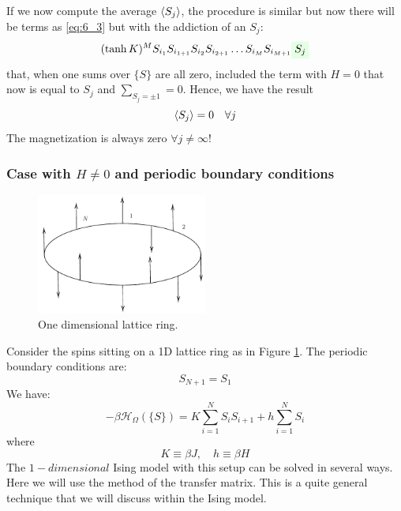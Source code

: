 \documentclass[../main/main.tex]{subfiles}
\begin{document}
 If we now compute the average \( \expval{S_j}  \), the procedure is similar but now there will be terms as \eqref{eq:6_3} but with the addiction of an \( S_j \):
\begin{equation}
  (\tanh K)^M S_{i_1} S_{i_{1+1}} S_{i_2} S_{i_{2+1}} \dots S_{i_M} S_{i_{M+1}} \mathcolorbox{green!10}{S_j}
\end{equation}
that, when one sums over \( \{ S \}   \) are all zero, included the term with \( H=0 \) that now is equal to \( S_j \) and \( \sum_{S_j = \pm 1}^{} = 0   \). Hence, we have the result
\begin{equation}
  \expval{S_j} = 0 \quad \forall j
\end{equation}
The magnetization is always zero \( \forall j \neq \infty  \)!


\subsubsection{Case with \( H\neq0 \) and periodic boundary conditions}
\label{sec:6_1}
\begin{figure}[h!]
\centering
\includegraphics[width=0.5\textwidth]{../lessons/6_image/4.pdf}
\caption{\label{fig:6_4} One dimensional lattice ring.}
\end{figure}
Consider the spins sitting on a 1D lattice ring as in Figure \ref{fig:6_4}. The periodic boundary conditions are:
\begin{equation}
  S_{N+1}=S_1
\end{equation}
We have:
\begin{equation}
  -\beta \mathcal{H}_ \Omega  ( \{ S \}  ) = K \sum_{i=1}^{N} S_i S_{i+1} + h \sum_{i=1}^{N} S_i
\end{equation}
where
\begin{equation}
   K \equiv \beta J,  \quad h \equiv \beta H
\end{equation}
The \( 1-dimensional \) Ising model with this setup can be solved in several ways. Here we will use the method of the transfer matrix. This is a quite general technique that we will discuss within the Ising model.
\end{document}
